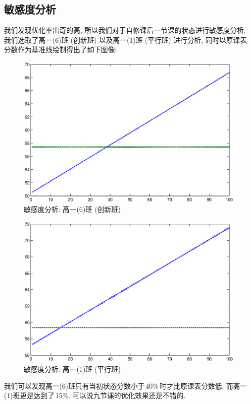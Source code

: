 \documentclass[a4paper]{article}
\begin{document}
 \subsection{敏感度分析}
  我们发现优化率出奇的高, 所以我们对于自修课后一节课的状态进行敏感度分析. 我们选取了高一(6)班 (创新班) 以及高一(1)班 (平行班) 进行分析, 同时以原课表分数作为基准线绘制得出了如下图像:
  \begin{figure}[H]
  \centerline{\includegraphics[scale=0.5]{seninno.eps}}
  \caption{敏感度分析: 高一(6)班 (创新班)}
  \end{figure}
  \begin{figure}[H]
  \centerline{\includegraphics[scale=0.5]{sennorm.eps}}
  \caption{敏感度分析: 高一(1)班 (平行班)}
  \end{figure}
  我们可以发现高一(6)班只有当初状态分数小于\,40\%\,时才比原课表分数低, 而高一(1)班更是达到了\,15\%. 可以说九节课的优化效果还是不错的.
\end{document}
